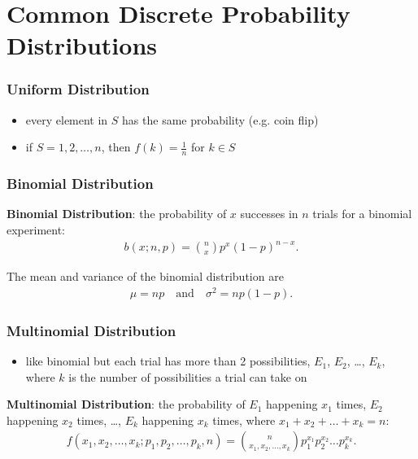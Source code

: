 \documentclass[10pt]{article}
\begin{document}
\newpage

\part{Common Discrete Probability Distributions}
\section{Uniform Distribution}
\begin{itemize}
    \item every element in $S$ has the same probability (e.g. coin flip)
    \item if $S = {1, 2, \ldots, n}$, then $f(k) = \frac{1}{n}$ for $k \in S$
\end{itemize}

\section{Binomial Distribution}
\begin{definition}
    \textbf{Binomial Distribution}: the probability of $x$ successes in $n$ trials for a binomial experiment:
    \begin{align*}
        b(x;n,p) = {n \choose x} p^x (1-p)^{n-x}
    .\end{align*}
\end{definition}
\begin{theorem}
    The mean and variance of the binomial distribution are 
    \begin{align*}
        \mu = np \quad \text{and} \quad \sigma^2 = np(1-p)
    .\end{align*}
\end{theorem}

\section{Multinomial Distribution}
\begin{itemize}
    \item like binomial but each trial has more than 2 possibilities, $E_1$, $E_2$, \ldots, $E_k$, where $k$ is the number of possibilities a trial can take on
\end{itemize}
\begin{definition}
    \textbf{Multinomial Distribution}: the probability of $E_1$ happening  $x_1$ times, $E_2$ happening $x_2$ times, \ldots, $E_k$ happening $x_k$ times, where $x_1 + x_2 + \ldots + x_k = n$:
    \begin{align*}
        f(x_1, x_2, \ldots, x_k; p_1, p_2, \ldots, p_k, n) = {n \choose x_1, x_2, \ldots, x_k} p_1^{x_1} p_2^{x_2} \ldots p_k^{x_k}
    .\end{align*}
\end{definition}
\end{document}
